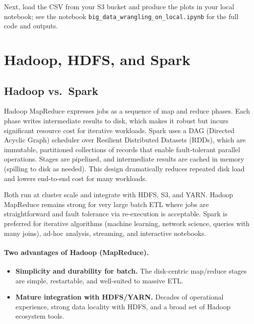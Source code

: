 \documentclass[11pt]{article}
\begin{document}
Next, load the CSV from your S3 bucket and produce the plots in your local notebook; see the notebook \texttt{big\_data\_wrangling\_on\_local.ipynb} for the full code and outputs.



\section{Hadoop, HDFS, and Spark}
\label{sec:hadoop_et_al}

\subsection{Hadoop vs.\ Spark}
\label{sec:hadoop_spark}


Hadoop MapReduce expresses jobs as a sequence of map and reduce phases. Each phase writes intermediate results to disk, which makes it robust but incurs significant resource cost for iterative workloads. Spark uses a DAG (Directed Acyclic Graph) scheduler over Resilient Distributed Datasets (RDDs), which are immutable, partitioned collections of records that enable fault-tolerant parallel operations. Stages are pipelined, and intermediate results are cached in memory (spilling to disk as needed). This design dramatically reduces repeated disk load and lowers end-to-end cost for many workloads.


Both run at cluster scale and integrate with HDFS, S3, and YARN. Hadoop MapReduce remains strong for very large batch ETL where jobs are straightforward and fault tolerance via re-execution is acceptable. Spark is preferred for iterative algorithms (machine learning, network science, queries with many joins), ad-hoc analysis, streaming, and interactive notebooks.

\paragraph{Two advantages of Hadoop (MapReduce).}
\begin{itemize}
  \item \textbf{Simplicity and durability for batch.} The disk-centric map/reduce stages are simple, restartable, and well-suited to massive ETL.
  \item \textbf{Mature integration with HDFS/YARN.} Decades of operational experience, strong data locality with HDFS, and a broad set of Hadoop ecosystem tools.
\end{itemize}
\end{document}
